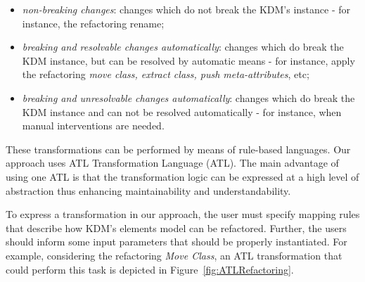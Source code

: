 \begin{itemize}
\item \textit{non-breaking changes}: changes which do not break the KDM's instance - for instance, the refactoring rename;

\item \textit{breaking and resolvable changes automatically}: changes which do break the KDM instance, but can be resolved by automatic means - for instance, apply the refactoring \textit{move class, extract class, push meta-attributes}, etc;

\item \textit{breaking and unresolvable changes automatically}: changes which do break the KDM instance and can not be resolved automatically - for instance, when manual interventions are needed.
%
\end{itemize} 
%
These transformations can be performed by means of rule-based languages. Our approach uses ATL Transformation Language (ATL). The main advantage of using one ATL is that the transformation logic can be expressed at a high level of abstraction thus enhancing maintainability and understandability. 

To express a transformation in our approach, the user must specify mapping rules that describe how KDM's elements model can be refactored. Further, the users should inform some input parameters that should be properly instantiated. For example, considering the refactoring \textit{Move Class}, an ATL transformation that could perform this task is depicted in Figure~\ref{fig:ATLRefactoring}.










